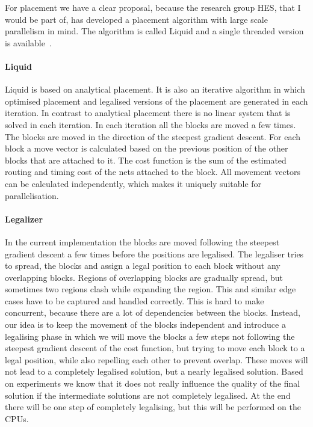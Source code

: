 \documentclass[a4paper,oneside,12pt]{article}
\begin{document}
For placement we have a clear proposal, because the research group HES, that I would be part of, has developed a placement algorithm with large scale parallelism in mind. The algorithm is called {\sc Liquid} and a single threaded version is available~\cite{liquid}.

\paragraph{{\sc Liquid}}
{\sc Liquid} is based on analytical placement. It is also an iterative algorithm in which optimised placement and legalised versions of the placement are generated in each iteration. In contrast to analytical placement there is no linear system that is solved in each iteration. In each iteration all the blocks are moved a few times.  The blocks are moved in the direction of the steepest gradient descent. For each block a move vector is calculated based on the previous position of the other blocks that are attached to it. The cost function is the sum of the estimated routing and timing cost of the nets attached to the block. All movement vectors can be calculated independently, which makes it uniquely suitable for parallelisation.


\paragraph{Legalizer}
In the current implementation the blocks are moved following the steepest gradient descent a few times before the positions are legalised. The legaliser tries to spread, the blocks and assign a legal position to each block without any overlapping blocks. Regions of overlapping blocks are gradually spread, but sometimes two regions clash while expanding the region. This and similar edge cases have to be captured and handled correctly. This is hard to make concurrent, because there are a lot of dependencies between the blocks.
Instead, our idea is to keep the movement of the blocks independent and introduce a legalising phase in which we will move the blocks a few steps not following the steepest gradient descent of the cost function, but trying to move each block to a legal position, while also repelling each other to prevent overlap. These moves will not lead to a completely legalised solution, but a nearly legalised solution. Based on experiments we know that it does not really influence the quality of the final solution if the intermediate solutions are not completely legalised.  At the end there will be one step of completely legalising, but this will be performed on the CPUs.
\end{document}

